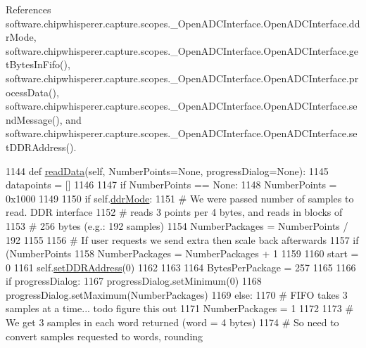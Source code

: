 References software.\+chipwhisperer.\+capture.\+scopes.\+\_\+\+Open\+A\+D\+C\+Interface.\+Open\+A\+D\+C\+Interface.\+ddr\+Mode, software.\+chipwhisperer.\+capture.\+scopes.\+\_\+\+Open\+A\+D\+C\+Interface.\+Open\+A\+D\+C\+Interface.\+get\+Bytes\+In\+Fifo(), software.\+chipwhisperer.\+capture.\+scopes.\+\_\+\+Open\+A\+D\+C\+Interface.\+Open\+A\+D\+C\+Interface.\+process\+Data(), software.\+chipwhisperer.\+capture.\+scopes.\+\_\+\+Open\+A\+D\+C\+Interface.\+Open\+A\+D\+C\+Interface.\+send\+Message(), and software.\+chipwhisperer.\+capture.\+scopes.\+\_\+\+Open\+A\+D\+C\+Interface.\+Open\+A\+D\+C\+Interface.\+set\+D\+D\+R\+Address().


\begin{DoxyCode}
1144     \textcolor{keyword}{def }\hyperlink{classsoftware_1_1chipwhisperer_1_1capture_1_1scopes_1_1__OpenADCInterface_1_1OpenADCInterface_a4bb9ec7b6248385dbd2e2573ecb8eaf2}{readData}(self, NumberPoints=None, progressDialog=None):
1145         datapoints = []
1146 
1147         \textcolor{keywordflow}{if} NumberPoints == \textcolor{keywordtype}{None}:
1148             NumberPoints = 0x1000
1149 
1150         \textcolor{keywordflow}{if} self.\hyperlink{classsoftware_1_1chipwhisperer_1_1capture_1_1scopes_1_1__OpenADCInterface_1_1OpenADCInterface_ac5e818ed51e968faffbc35028973bd4b}{ddrMode}:
1151             \textcolor{comment}{# We were passed number of samples to read. DDR interface}
1152             \textcolor{comment}{# reads 3 points per 4 bytes, and reads in blocks of}
1153             \textcolor{comment}{# 256 bytes (e.g.: 192 samples)}
1154             NumberPackages = NumberPoints / 192
1155 
1156             \textcolor{comment}{# If user requests we send extra then scale back afterwards}
1157             \textcolor{keywordflow}{if} (NumberPoints %
1158                 NumberPackages = NumberPackages + 1
1159 
1160             start = 0
1161             self.\hyperlink{classsoftware_1_1chipwhisperer_1_1capture_1_1scopes_1_1__OpenADCInterface_1_1OpenADCInterface_a61bc341223d1888788d0f4a360010fad}{setDDRAddress}(0)
1162 
1163 
1164             BytesPerPackage = 257
1165 
1166             \textcolor{keywordflow}{if} progressDialog:
1167                 progressDialog.setMinimum(0)
1168                 progressDialog.setMaximum(NumberPackages)
1169         \textcolor{keywordflow}{else}:
1170             \textcolor{comment}{# FIFO takes 3 samples at a time... todo figure this out}
1171             NumberPackages = 1
1172 
1173             \textcolor{comment}{# We get 3 samples in each word returned (word = 4 bytes)}
1174             \textcolor{comment}{# So need to convert samples requested to words, rounding}

\end{DoxyCode}
